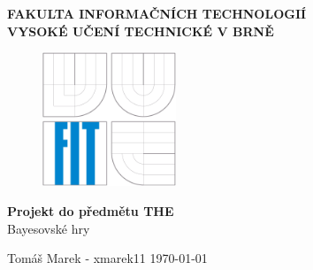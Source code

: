 \documentclass[12pt,a4paper,titlepage,final]{article}
\begin{document}
\begin{titlepage}
\begin{center}

    \vspace{5mm}
    {\LARGE \bf \sc \MakeUppercase{Fakulta informačních technologií} }\\[5mm]%
    {\Large \bf \sc \MakeUppercase{Vysoké učení technické v Brně} }\\[5mm]%
    \vspace{10mm}
\begin{figure}[h]
    \begin{center}
      \includegraphics[width=4cm,keepaspectratio]{img/logo}
    \end{center}
\end{figure}
\vspace{20mm}
{\Huge \bfseries Projekt do předmětu THE}\\[5mm]
{\Large Bayesovské hry}

\vfill
\vfill
\begin{flushleft}
    Tomáš Marek - xmarek11 \hfill \today 
\end{flushleft}
\end{center}

\end{titlepage}

\newpage

\tableofcontents
{}
\setcounter{page}{1}

\newpage
\end{document}
